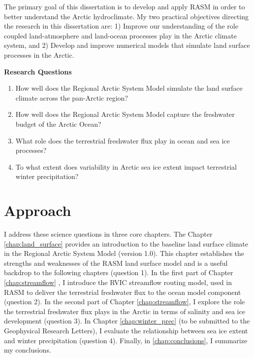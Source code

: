 The primary goal of this dissertation is to develop and apply RASM in order to better understand the Arctic hydroclimate.
My two practical objectives directing the research in this dissertation are: 1) Improve our understanding of the role coupled land-atmosphere and land-ocean processes play in the Arctic climate system, and 2) Develop and improve numerical models that simulate land surface processes in the Arctic.

\begin{mdframed}
  {\bf Research Questions}
  \begin{enumerate}
    \item How well does the Regional Arctic System Model simulate the land surface climate across the pan-Arctic region?
    \item How well does the Regional Arctic System Model capture the freshwater budget of the Arctic Ocean?
    \item What role does the terrestrial freshwater flux play in ocean and sea ice processes?
    \item To what extent does variability in Arctic sea ice extent impact terrestrial winter precipitation?
  \end{enumerate}
\end{mdframed}

\section{Approach}

I address these science questions in three core chapters.
The Chapter \ref{chap:land_surface} \citep[published as ][]{Hamman_2016a} provides an introduction to the baseline land surface climate in the Regional Arctic System Model (version 1.0).
This chapter establishes the strengths and weaknesses of the RASM land surface model and is a useful backdrop to the following chapters (question 1).
In the first part of Chapter \ref{chap:streamflow} \citep[in review as ][]{Hamman_2016b}, I introduce the RVIC streamflow routing model, used in RASM to deliver the terrestrial freshwater flux to the ocean model component (question 2).
In the second part of Chapter \ref{chap:streamflow}, I explore the role the terrestrial freshwater flux plays in the Arctic in terms of salinity and sea ice development (question 3).
In Chapter \ref{chap:winter_prec} (to be submitted to the Geophysical Research Letters), I evaluate the relationship between sea ice extent and winter precipitation (question 4).
Finally, in \ref{chap:conclusions}, I summarize my conclusions.
